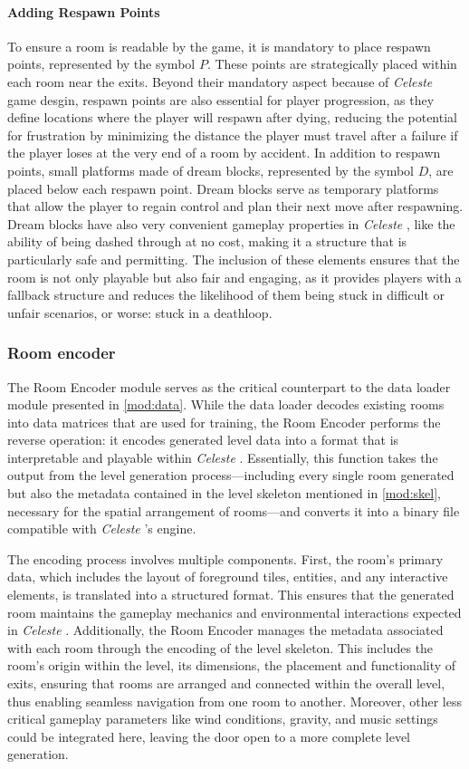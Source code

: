 \documentclass{article}
\newcommand{\Celeste}{\textit{Celeste} }
\begin{document}
\paragraph{Adding Respawn Points} To ensure a room is readable by the game, it is mandatory to place respawn points, represented by the symbol $P$. These points are strategically placed within each room near the exits. Beyond their mandatory aspect because of \Celeste game desgin, respawn points are also essential for player progression, as they define locations where the player will respawn after dying, reducing the potential for frustration by minimizing the distance the player must travel after a failure if the player loses at the very end of a room by accident. In addition to respawn points, small platforms made of dream blocks, represented by the symbol $D$, are placed below each respawn point. Dream blocks serve as temporary platforms that allow the player to regain control and plan their next move after respawning. Dream blocks have also very convenient gameplay properties in \Celeste, like the ability of being dashed through at no cost, making it a structure that is particularly safe and permitting. The inclusion of these elements ensures that the room is not only playable but also fair and engaging, as it provides players with a fallback structure and reduces the likelihood of them being stuck in difficult or unfair scenarios, or worse: stuck in a deathloop.

\noindent 


\subsubsection{Room encoder} \label{mod:julia}
The Room Encoder module serves as the critical counterpart to the data loader module presented in \ref{mod:data}. While the data loader decodes existing rooms into data matrices that are used for training, the Room Encoder performs the reverse operation: it encodes generated level data into a format that is interpretable and playable within \Celeste. Essentially, this function takes the output from the level generation process—including every single room generated but also the metadata contained in the level skeleton mentioned in \ref{mod:skel}, necessary for the spatial arrangement of rooms—and converts it into a binary file compatible with \Celeste's engine.

\noindent The encoding process involves multiple components. First, the room's primary data, which includes the layout of foreground tiles, entities, and any interactive elements, is translated into a structured format. This ensures that the generated room maintains the gameplay mechanics and environmental interactions expected in \Celeste. Additionally, the Room Encoder manages the metadata associated with each room through the encoding of the level skeleton. This includes the room's origin within the level, its dimensions, the placement and functionality of exits, ensuring that rooms are arranged and connected within the overall level, thus enabling seamless navigation from one room to another. Moreover, other less critical gameplay parameters like wind conditions, gravity, and music settings could be integrated here, leaving the door open to a more complete level generation.
\end{document}
